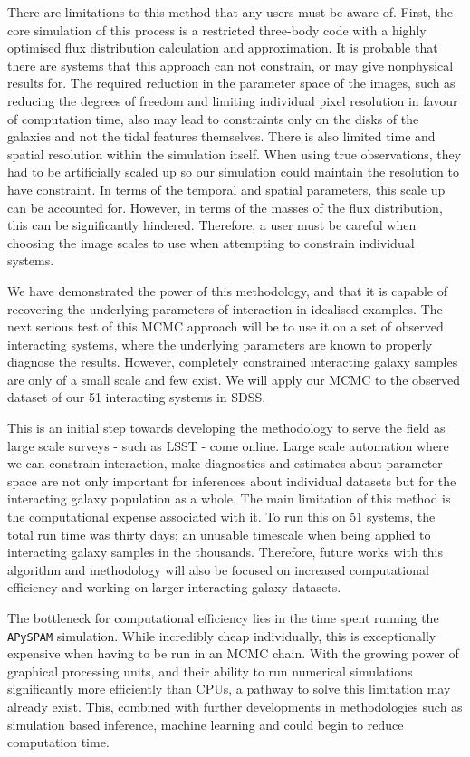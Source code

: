 There are limitations to this method that any users must be aware of. First, the core simulation of this process is a restricted three-body code with a highly optimised flux distribution calculation and approximation. It is probable that there are systems that this approach can not constrain, or may give nonphysical results for. The required reduction in the parameter space of the images, such as reducing the degrees of freedom and limiting individual pixel resolution in favour of computation time, also may lead to constraints only on the disks of the galaxies and not the tidal features themselves. There is also limited time and spatial resolution within the simulation itself. When using true observations, they had to be artificially scaled up so our simulation could maintain the resolution to have constraint. In terms of the temporal and spatial parameters, this scale up can be accounted for. However, in terms of the masses of the flux distribution, this can be significantly hindered. Therefore, a user must be careful when choosing the image scales to use when attempting to constrain individual systems. 

We have demonstrated the power of this methodology, and that it is capable of recovering the underlying parameters of interaction in idealised examples. The next serious test of this MCMC approach will be to use it on a set of observed interacting systems, where the underlying parameters are known to properly diagnose the results. However, completely constrained interacting galaxy samples are only of a small scale and few exist. We will apply our MCMC to the observed dataset of our 51 interacting systems in SDSS.

This is an initial step towards developing the methodology to serve the field as large scale surveys - such as LSST - come online. Large scale automation where we can constrain interaction, make diagnostics and estimates about parameter space are not only important for inferences about individual datasets but for the interacting galaxy population as a whole. The main limitation of this method is the computational expense associated with it. To run this on 51 systems, the total run time was thirty days; an unusable timescale when being applied to interacting galaxy samples in the thousands. Therefore, future works with this algorithm and methodology will also be focused on increased computational efficiency and working on larger interacting galaxy datasets. 

The bottleneck for computational efficiency lies in the time spent running the \texttt{APySPAM} simulation. While incredibly cheap individually, this is exceptionally expensive when having to be run in an MCMC chain. With the growing power of graphical processing units, and their ability to run numerical simulations significantly more efficiently than CPUs, a pathway to solve this limitation may already exist. This, combined with further developments in methodologies such as simulation based inference, machine learning and \DIFdelbegin {}\DIFdelend \DIFaddbegin {}\DIFaddend could begin to reduce computation time.
